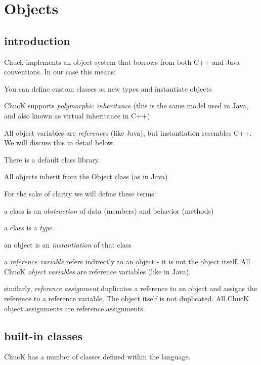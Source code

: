 \chapter{Objects}

\section{introduction}

Chuck implements an object system that borrows from both C++ and Java conventions. In our case this means:
\begin{chuckitemize}
\item You can define custom classes as new types and instantiate objects
\item ChucK supports {\it polymorphic inheritance} (this is the same model used in Java, and also known as virtual inheritance in C++)
\item All object variables are {\it references} (like Java), but instantiation resembles C++. We will discuss this in detail below.
\item There is a default class library.
\item All objects inherit from the Object class (as in Java)
\end{chuckitemize}

For the sake of clarity we will define these terms:

\begin{chuckitemize}
\item a class is an {\it abstraction} of data (members) and behavior (methods)
\item a class is a {\it type}.
\item an object is an {\it instantiation} of that class
\item a {\it reference variable} refers indirectly to an object - it is not the object itself. All ChucK {\it object variables} are reference variables (like in Java).
\item similarly, {\it reference assignment} duplicates a reference to an object and assigns the reference to a reference variable. The object itself is not duplicated. All ChucK object assignments are reference assignments.
\end{chuckitemize}


\section{built-in classes}

ChucK has a number of classes defined within the language.

